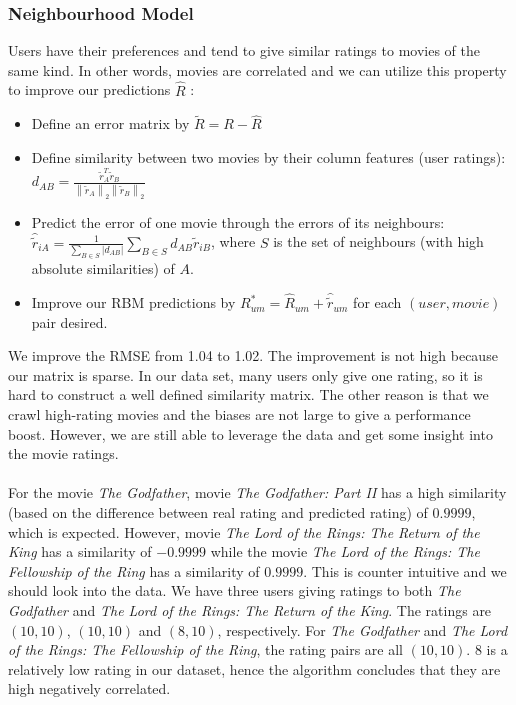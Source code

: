 \begin{CJK*}{UTF8}{gbsn}
\subsubsection{Neighbourhood Model}
Users have their preferences and tend to give similar ratings to movies of the same kind. In other words, movies are correlated and we can utilize this property to improve our predictions $ \hat{R} $ :
\begin{itemize}
    \item Define an error matrix by $ \widetilde{R} = R - \hat{R} $
    \item Define similarity between two movies by their column features (user ratings): $ d_{A B}=\frac{\tilde{r}_{A}^{T} \widetilde{r}_{B}}{\left\|\widetilde{r}_{A}\right\|_{2}\left\|\widetilde{r}_{B}\right\|_{2}} $
    \item Predict the error of one movie through the errors of its neighbours: $ \hat{\tilde{r}}_{i A}=\frac{1}{\sum_{B \in S}\left|d_{A B}\right|} \sum_{B \in S} d_{A B} \widetilde{r}_{i B}  $, where $ S $ is the set of neighbours (with high absolute similarities) of $ A $.
    \item Improve our RBM predictions by $ R_{u m}^{*}=\hat{R}_{u m}+\hat{\tilde{r}}_{u m} $ for each $ (user, movie) $ pair desired.
\end{itemize}
We improve the RMSE from 1.04 to 1.02. The improvement is not high because our matrix is sparse. In our data set, many users only give one rating, so it is hard to construct a well defined similarity matrix. The other reason is that we crawl high-rating movies and the biases are not large to give a performance boost. However, we are still able to leverage the data and get some insight into the movie ratings. \\\\
For the movie \textit{The Godfather}, movie \textit{The Godfather: Part II} has a high similarity (based on the difference between real rating and predicted rating) of $ 0.9999 $, which is expected. However, movie \textit{The Lord of the Rings: The Return of the King} has a similarity of $ -0.9999 $ while the movie \textit{The Lord of the Rings: The Fellowship of the Ring} has a similarity of $ 0.9999 $. This is counter intuitive and we should look into the data. We have three users giving ratings to both \textit{The Godfather} and \textit{The Lord of the Rings: The Return of the King}. The ratings are $ (10, 10) $, $ (10, 10) $ and $ (8, 10) $, respectively. For \textit{The Godfather} and \textit{The Lord of the Rings: The Fellowship of the Ring}, the rating pairs are all $ (10, 10) $. 8 is a relatively low rating in our dataset, hence the algorithm concludes that they are high negatively correlated.


\end{CJK*}

